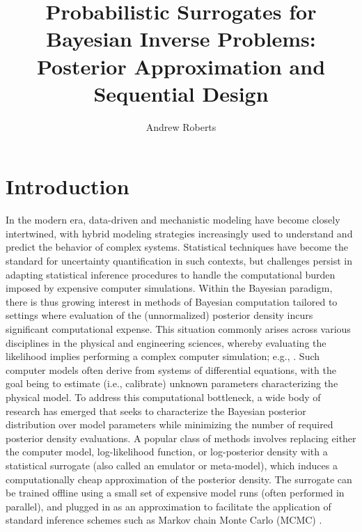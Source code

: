 \documentclass[12pt]{article}
\title{Probabilistic Surrogates for Bayesian Inverse Problems: Posterior Approximation and Sequential Design}
\author{Andrew Roberts}
\begin{document}
\maketitle

\section{Introduction}
In the modern era, data-driven and mechanistic modeling have become closely intertwined, with hybrid modeling strategies 
increasingly used to understand and predict the behavior of complex systems. Statistical techniques have become 
the standard for uncertainty quantification in such contexts, but challenges persist in adapting statistical inference procedures
to handle the computational burden imposed by expensive computer simulations. 
Within the Bayesian paradigm, there is thus growing interest in methods of Bayesian computation tailored to settings 
where evaluation of the (unnormalized) posterior density incurs significant computational expense. 
This situation commonly arises across various disciplines in the physical and engineering sciences, whereby evaluating 
the likelihood implies performing a complex computer simulation; e.g., \citep{ESM_modeling_2pt0,FerEmulation}. 
Such computer models often derive from systems of differential equations, with the goal being to estimate (i.e., calibrate) 
unknown parameters characterizing the physical model.
To address this computational bottleneck, a wide body of research has emerged that seeks to characterize the Bayesian 
posterior distribution over model parameters while minimizing the number of required posterior density evaluations. 
A popular class of methods involves replacing either the computer model, log-likelihood function, or
log-posterior density with a statistical surrogate (also called an emulator or meta-model), which induces a computationally 
cheap approximation of the posterior density.
The surrogate can be trained offline using a small set of expensive model runs (often performed in 
parallel), and plugged in as an approximation to facilitate the application of 
standard inference schemes such as Markov chain Monte Carlo (MCMC) 
\citep{modularization,BurknerSurrogate,BurknerTwoStep}.
\end{document}
